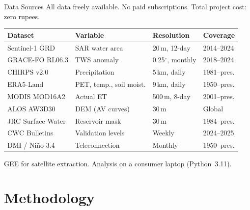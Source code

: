 \documentclass[10pt]{beamer}
\begin{document}
\begin{frame}{Data Sources}
  \small
  All data freely available. No paid subscriptions.
  Total project cost: zero rupees.

  \medskip
  {\footnotesize
  \begin{tabular}{@{}L{2.8cm}L{2.8cm}L{2.2cm}L{2.0cm}@{}}
    \toprule
    \textbf{Dataset} & \textbf{Variable} &
    \textbf{Resolution} & \textbf{Coverage} \\
    \midrule
    Sentinel-1 GRD    & SAR water area        & 20\,m, 12-day
      & 2014--2024 \\
    GRACE-FO RL06.3   & TWS anomaly           & 0.25$^\circ$, monthly
      & 2018--2024 \\
    CHIRPS v2.0       & Precipitation         & 5\,km, daily
      & 1981--pres. \\
    ERA5-Land          & PET, temp., soil moist. & 9\,km, daily
      & 1950--pres. \\
    MODIS MOD16A2      & Actual ET             & 500\,m, 8-day
      & 2001--pres. \\
    ALOS AW3D30        & DEM (AV curves)       & 30\,m
      & Global \\
    JRC Surface Water  & Reservoir mask        & 30\,m
      & 1984--pres. \\
    CWC Bulletins      & Validation levels     & Weekly
      & 2024--2025 \\
    DMI / Ni\~{n}o-3.4 & Teleconnection        & Monthly
      & 1950--pres. \\
    \bottomrule
  \end{tabular}}

  \medskip
  {\small GEE for satellite extraction.
  Analysis on a consumer laptop (Python~3.11).}
\end{frame}


\section{Methodology}
\end{document}
